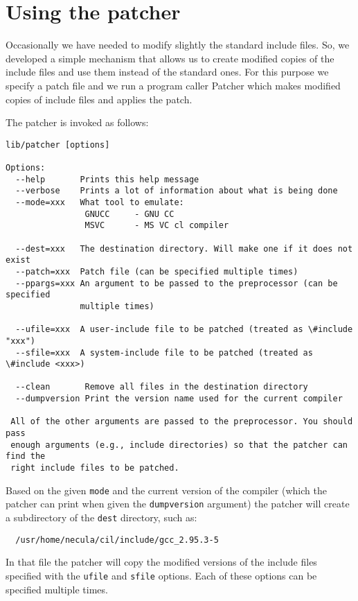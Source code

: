\documentclass[letterpaper]{article}
\def\t#1{{\tt #1}}
\begin{document}
    \section{Using the patcher}\label{sec-patcher}

 Occasionally we have needed to modify slightly the standard include files.
So, we developed a simple mechanism that allows us to create modified copies
of the include files and use them instead of the standard ones. For this
purpose we specify a patch file and we run a program caller Patcher which
makes modified copies of include files and applies the patch.

 The patcher is invoked as follows: 
\begin{verbatim}
lib/patcher [options]

Options:
  --help       Prints this help message
  --verbose    Prints a lot of information about what is being done
  --mode=xxx   What tool to emulate: 
                GNUCC     - GNU CC
                MSVC      - MS VC cl compiler

  --dest=xxx   The destination directory. Will make one if it does not exist
  --patch=xxx  Patch file (can be specified multiple times)
  --ppargs=xxx An argument to be passed to the preprocessor (can be specified
               multiple times)

  --ufile=xxx  A user-include file to be patched (treated as \#include "xxx")
  --sfile=xxx  A system-include file to be patched (treated as \#include <xxx>)
 
  --clean       Remove all files in the destination directory
  --dumpversion Print the version name used for the current compiler

 All of the other arguments are passed to the preprocessor. You should pass
 enough arguments (e.g., include directories) so that the patcher can find the
 right include files to be patched.
\end{verbatim}

 Based on the given \t{mode} and the current version of the compiler (which
the patcher can print when given the \t{dumpversion} argument) the patcher
will create a subdirectory of the \t{dest} directory, such as:
\begin{verbatim}
  /usr/home/necula/cil/include/gcc_2.95.3-5
\end{verbatim}

 In that file the patcher will copy the modified versions of the include files
specified with the \t{ufile} and \t{sfile} options. Each of these options can
be specified multiple times. 
\end{document}
